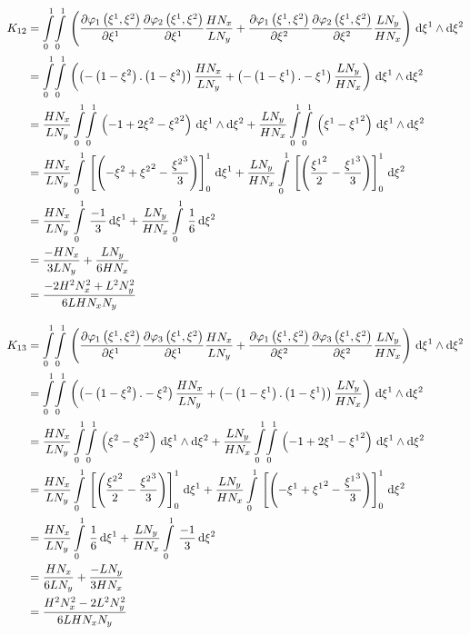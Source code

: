 \begin{equation}
  \begin{aligned}
    K_{12}&=\giint{0}{1}{0}{1}{\pbrac{\delby{\lbfn{1}{\xione,\xitwo}}{\xione}\delby{\lbfn{2}{\xione,\xitwo}}{\xione}
        \dfrac{H N_{x}}{L N_{y}}+\delby{\lbfn{1}{\xione,\xitwo}}{\xitwo}\delby{\lbfn{2}{\xione,\xitwo}}{\xitwo}
        \dfrac{L N_{y}}{H N_{x}}}}{\xione}{\xitwo}\\
    &=\giint{0}{1}{0}{1}{\pbrac{\pbrac{-\pbrac{1-\xitwo}.\pbrac{1-\xitwo}}\dfrac{H N_{x}}{L N_{y}}+
    \pbrac{-\pbrac{1-\xione}.-\xione}\dfrac{L N_{y}}{H N_{x}}}}{\xione}{\xitwo} \\
    &=\dfrac{H N_{x}}{L N_{y}}\giint{0}{1}{0}{1}{\pbrac{-1+2\xitwo-\xitwosq}}{\xione}{\xitwo}+
    \dfrac{L N_{y}}{H N_{x}}\giint{0}{1}{0}{1}{\pbrac{\xione-\xionesq}}{\xione}{\xitwo} \\
    &=\dfrac{H N_{x}}{L N_{y}}\gint{0}{1}{\sqbrac{\pbrac{-\xitwo+\xitwosq-\dfrac{\xitwocube}{3}}}_{0}^{1}}{\xione}+
    \dfrac{L N_{y}}{H N_{x}}\gint{0}{1}{\sqbrac{\pbrac{\dfrac{\xionesq}{2}-\dfrac{\xionecube}{3}}}_{0}^{1}}{\xitwo} \\
    &=\dfrac{H N_{x}}{L N_{y}}\gint{0}{1}{\dfrac{-1}{3}}{\xione}+\dfrac{L N_{y}}{H N_{x}}\gint{0}{1}{\dfrac{1}{6}}{\xitwo} \\
    &=\dfrac{-H N_{x}}{3 L N_{y}}+\dfrac{L N_{y}}{6 H N_{x}} \\
    &=\dfrac{-2 H^{2}N_{x}^{2} + L^{2}N_{y}^{2}}{6 L H N_{x} N_{y}}
  \end{aligned}
\end{equation}

\begin{equation}
  \begin{aligned}
    K_{13}&=\giint{0}{1}{0}{1}{\pbrac{\delby{\lbfn{1}{\xione,\xitwo}}{\xione}\delby{\lbfn{3}{\xione,\xitwo}}{\xione}
        \dfrac{H N_{x}}{L N_{y}}+\delby{\lbfn{1}{\xione,\xitwo}}{\xitwo}\delby{\lbfn{3}{\xione,\xitwo}}{\xitwo}
        \dfrac{L N_{y}}{H N_{x}}}}{\xione}{\xitwo}\\
    &=\giint{0}{1}{0}{1}{\pbrac{\pbrac{-\pbrac{1-\xitwo}.-\xitwo}\dfrac{H N_{x}}{L N_{y}}+
    \pbrac{-\pbrac{1-\xione}.\pbrac{1-\xione}}\dfrac{L N_{y}}{H N_{x}}}}{\xione}{\xitwo} \\
    &=\dfrac{H N_{x}}{L N_{y}}\giint{0}{1}{0}{1}{\pbrac{\xitwo-\xitwosq}}{\xione}{\xitwo}+
    \dfrac{L N_{y}}{H N_{x}}\giint{0}{1}{0}{1}{\pbrac{-1+2\xione-\xionesq}}{\xione}{\xitwo} \\
    &=\dfrac{H N_{x}}{L N_{y}}\gint{0}{1}{\sqbrac{\pbrac{\dfrac{\xitwosq}{2}-\dfrac{\xitwocube}{3}}}_{0}^{1}}{\xione}+
    \dfrac{L N_{y}}{H N_{x}}\gint{0}{1}{\sqbrac{\pbrac{-\xione+\xionesq-\dfrac{\xionecube}{3}}}_{0}^{1}}{\xitwo} \\
    &=\dfrac{H N_{x}}{L N_{y}}\gint{0}{1}{\dfrac{1}{6}}{\xione}+\dfrac{L N_{y}}{H N_{x}}\gint{0}{1}{\dfrac{-1}{3}}{\xitwo} \\
    &=\dfrac{H N_{x}}{6 L N_{y}}+\dfrac{-L N_{y}}{3 H N_{x}} \\
    &=\dfrac{H^{2}N_{x}^{2}- 2 L^{2}N_{y}^{2}}{6 L H N_{x} N_{y}}
  \end{aligned}
\end{equation}

